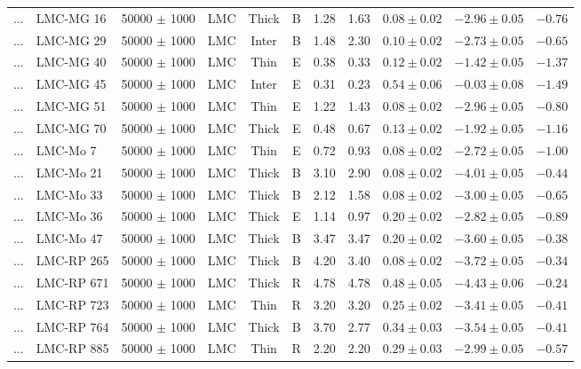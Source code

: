 \documentclass[useAMS]{mn2e}
\begin{document}
\begin{center}
{\begin{longtable}{llccccccccc}
$\ldots$	&	LMC-MG 16	&	50000 $\pm$ 1000	&	LMC	&	Thick	&	B	&	1.28	&	1.63	&	$0.08 \pm  0.02$	&	$-2.96 \pm 0.05$	&	$-0.76$	\\
$\ldots$	&	LMC-MG 29	&	50000 $\pm$ 1000	&	LMC	&	Inter	&	B	&	1.48	&	2.30	&	$0.10 \pm  0.02$	&	$-2.73 \pm 0.05$	&	$-0.65$	\\
$\ldots$	&	LMC-MG 40	&	50000 $\pm$ 1000	&	LMC	&	Thin	&	E	&	0.38	&	0.33	&	$0.12 \pm  0.02$	&	$-1.42 \pm 0.05$	&	$-1.37$	\\
$\ldots$	&	LMC-MG 45	&	50000 $\pm$ 1000	&	LMC	&	Inter	&	E	&	0.31	&	0.23	&	$0.54 \pm  0.06$	&	$-0.03 \pm 0.08$	&	$-1.49$	\\
$\ldots$	&	LMC-MG 51	&	50000 $\pm$ 1000	&	LMC	&	Thin	&	E	&	1.22	&	1.43	&	$0.08 \pm  0.02$	&	$-2.96 \pm 0.05$	&	$-0.80$	\\
$\ldots$	&	LMC-MG 70	&	50000 $\pm$ 1000	&	LMC	&	Thick	&	E	&	0.48	&	0.67	&	$0.13 \pm  0.02$	&	$-1.92 \pm 0.05$	&	$-1.16$	\\
$\ldots$	&	LMC-Mo 7	&	50000 $\pm$ 1000	&	LMC	&	Thin	&	E	&	0.72	&	0.93	&	$0.08 \pm  0.02$	&	$-2.72 \pm 0.05$	&	$-1.00$	\\
$\ldots$	&	LMC-Mo 21	&	50000 $\pm$ 1000	&	LMC	&	Thick	&	B	&	3.10	&	2.90	&	$0.08 \pm  0.02$	&	$-4.01 \pm 0.05$	&	$-0.44$	\\
$\ldots$	&	LMC-Mo 33	&	50000 $\pm$ 1000	&	LMC	&	Thick	&	B	&	2.12	&	1.58	&	$0.08 \pm  0.02$	&	$-3.00 \pm 0.05$	&	$-0.65$	\\
$\ldots$	&	LMC-Mo 36	&	50000 $\pm$ 1000	&	LMC	&	Thick	&	E	&	1.14	&	0.97	&	$0.20 \pm  0.02$	&	$-2.82 \pm 0.05$	&	$-0.89$	\\
$\ldots$	&	LMC-Mo 47	&	50000 $\pm$ 1000	&	LMC	&	Thick	&	B	&	3.47	&	3.47	&	$0.20 \pm  0.02$	&	$-3.60 \pm 0.05$	&	$-0.38$	\\
$\ldots$	&	LMC-RP 265	&	50000 $\pm$ 1000	&	LMC	&	Thick	&	B	&	4.20	&	3.40	&	$0.08 \pm  0.02$	&	$-3.72 \pm 0.05$	&	$-0.34$	\\
$\ldots$	&	LMC-RP 671	&	50000 $\pm$ 1000	&	LMC	&	Thick	&	R	&	4.78	&	4.78	&	$0.48 \pm  0.05$	&	$-4.43 \pm 0.06$	&	$-0.24$	\\
$\ldots$	&	LMC-RP 723	&	50000 $\pm$ 1000	&	LMC	&	Thin	&	R	&	3.20	&	3.20	&	$0.25 \pm  0.02$	&	$-3.41 \pm 0.05$	&	$-0.41$	\\
$\ldots$	&	LMC-RP 764	&	50000 $\pm$ 1000	&	LMC	&	Thick	&	B	&	3.70	&	2.77	&	$0.34 \pm  0.03$	&	$-3.54 \pm 0.05$	&	$-0.41$	\\
$\ldots$	&	LMC-RP 885	&	50000 $\pm$ 1000	&	LMC	&	Thin	&	R	&	2.20	&	2.20	&	$0.29 \pm  0.03$	&	$-2.99 \pm 0.05$	&	$-0.57$	\\

\end{longtable}}
\end{center}
\end{document}
